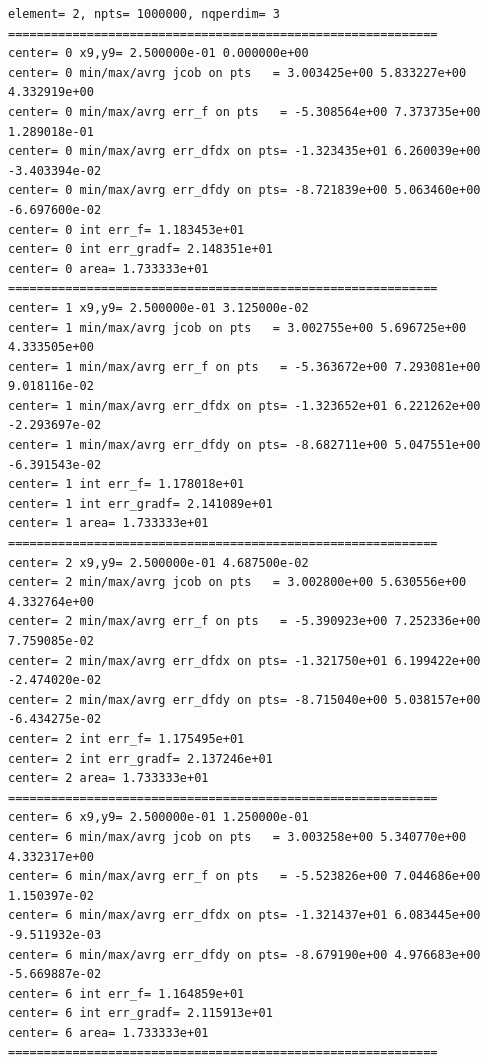 \begin{tiny}
\begin{verbatim}
element= 2, npts= 1000000, nqperdim= 3
============================================================
center= 0 x9,y9= 2.500000e-01 0.000000e+00 
center= 0 min/max/avrg jcob on pts   = 3.003425e+00 5.833227e+00 4.332919e+00
center= 0 min/max/avrg err_f on pts   = -5.308564e+00 7.373735e+00 1.289018e-01
center= 0 min/max/avrg err_dfdx on pts= -1.323435e+01 6.260039e+00 -3.403394e-02
center= 0 min/max/avrg err_dfdy on pts= -8.721839e+00 5.063460e+00 -6.697600e-02
center= 0 int err_f= 1.183453e+01
center= 0 int err_gradf= 2.148351e+01
center= 0 area= 1.733333e+01
============================================================
center= 1 x9,y9= 2.500000e-01 3.125000e-02 
center= 1 min/max/avrg jcob on pts   = 3.002755e+00 5.696725e+00 4.333505e+00
center= 1 min/max/avrg err_f on pts   = -5.363672e+00 7.293081e+00 9.018116e-02
center= 1 min/max/avrg err_dfdx on pts= -1.323652e+01 6.221262e+00 -2.293697e-02
center= 1 min/max/avrg err_dfdy on pts= -8.682711e+00 5.047551e+00 -6.391543e-02
center= 1 int err_f= 1.178018e+01
center= 1 int err_gradf= 2.141089e+01
center= 1 area= 1.733333e+01
============================================================
center= 2 x9,y9= 2.500000e-01 4.687500e-02 
center= 2 min/max/avrg jcob on pts   = 3.002800e+00 5.630556e+00 4.332764e+00
center= 2 min/max/avrg err_f on pts   = -5.390923e+00 7.252336e+00 7.759085e-02
center= 2 min/max/avrg err_dfdx on pts= -1.321750e+01 6.199422e+00 -2.474020e-02
center= 2 min/max/avrg err_dfdy on pts= -8.715040e+00 5.038157e+00 -6.434275e-02
center= 2 int err_f= 1.175495e+01
center= 2 int err_gradf= 2.137246e+01
center= 2 area= 1.733333e+01
============================================================
center= 6 x9,y9= 2.500000e-01 1.250000e-01 
center= 6 min/max/avrg jcob on pts   = 3.003258e+00 5.340770e+00 4.332317e+00
center= 6 min/max/avrg err_f on pts   = -5.523826e+00 7.044686e+00 1.150397e-02
center= 6 min/max/avrg err_dfdx on pts= -1.321437e+01 6.083445e+00 -9.511932e-03
center= 6 min/max/avrg err_dfdy on pts= -8.679190e+00 4.976683e+00 -5.669887e-02
center= 6 int err_f= 1.164859e+01
center= 6 int err_gradf= 2.115913e+01
center= 6 area= 1.733333e+01
============================================================
\end{verbatim}
\end{tiny}



